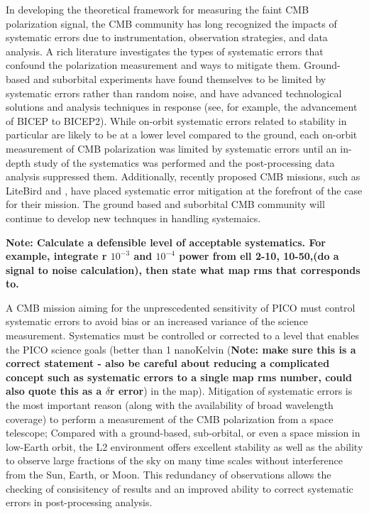 \documentclass[PICOReport.tex]{subfiles}
\begin{document}
% 
%
%
%

In developing the theoretical framework for measuring the faint CMB
polarization signal, the CMB community has long recognized the impacts
of systematic errors due to instrumentation, observation strategies, and data analysis.   
A rich literature investigates the types of
systematic errors that confound the polarization measurement and ways
to mitigate them\cite{hu03}. 
Ground-based and suborbital experiments have found themselves to be limited by systematic errors rather than random noise, and have advanced technological solutions and analysis techniques in response (see, for example, the advancement of BICEP\cite{Takahaski2010} to BICEP2\cite{BICEP2_III}).
While on-orbit systematic errors related to stability in particular are likely to be at a lower level compared to the ground, each on-orbit measurement of CMB polarization was limited by
systematic errors until an in-depth study of the systematics was
performed and the post-processing data analysis suppressed them\cite{Bennett13,planck2016_xlvi}. 
Additionally, recently proposed CMB missions, such as LiteBird and \core, have placed
systematic error mitigation at the forefront of the case for their
mission\cite{hazumi2012,wallis2017,Natoli2018}.
The ground based and suborbital CMB community will continue to develop new technques in handling systemaics.

\textbf{Note: Calculate a defensible level of acceptable systematics.
For example, integrate r $10^{-3}$ and $10^{-4}$ power from ell 2-10, 10-50,(do a signal to
noise calculation), then state what map rms that corresponds to.  }

A CMB mission aiming for the unprescedented sensitivity of PICO must control
systematic errors to avoid bias or an increased variance of the
science measurement.   
Systematics must be controlled or corrected to a level that enables the PICO
science goals (better than 1 nanoKelvin (\textbf{Note: make sure this is a
  correct statement - also be careful about reducing a complicated
  concept such as systematic errors to a single map rms number, could also
  quote this as a $\delta$r error}) in the map).
Mitigation of systematic errors is the most important reason (along
with the availability of broad wavelength coverage) to perform a
measurement of the CMB polarization from a space telescope; Compared
with a ground-based, sub-orbital, or even a space mission in 
low-Earth orbit, the L2 environment offers excellent stability as well
as the ability to observe large fractions of the sky on many time
scales without interference from the Sun, Earth, or Moon.
This redundancy of observations allows the checking of consisitency of
results and an improved ability to correct systematic errors in
post-processing analysis.
\end{document}
